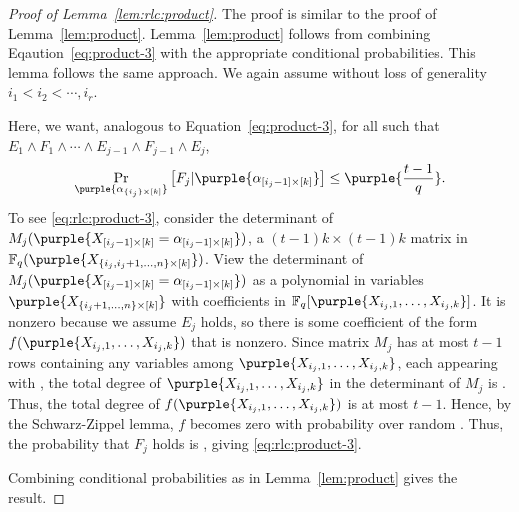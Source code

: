 \documentclass{article}[11pt]
\begin{document}
\begin{proof}[Proof of Lemma~\ref{lem:rlc:product}]
  The proof is similar to the proof of Lemma~\ref{lem:product}.
  Lemma~\ref{lem:product} follows from combining Eqaution~\eqref{eq:product-3} with the appropriate conditional probabilities.
  This lemma follows the same approach.
  We again assume without loss of generality $i_1<i_2<\cdots,i_r$.

  Here, we want, analogous to Equation~\eqref{eq:product-3}, for all \purple{$\alpha_{[i_j-1]\times [k]}$} such that $E_1\wedge F_1\wedge\cdots\wedge E_{j-1}\wedge F_{j-1}\wedge E_j$,
  \begin{align}
    \Pr_{\purple{\alpha_{\{i_j\}\times [k]}}}\left[F_j|\purple{\alpha_{[i_j-1]\times [k]}}\right]\le \purple{\frac{t-1}{q}}.
    \label{eq:rlc:product-3}
  \end{align}
  To see \eqref{eq:rlc:product-3}, consider the determinant of $M_j(\purple{X_{[i_j-1]\times [k]}=\alpha_{[i_j-1]\times [k]}})$, a $(t-1)k\times (t-1)k$ matrix in $\mathbb{F}_q(\purple{X_{\{i_j,i_j+1,\dots,n\}\times [k]}})$. 
  View the determinant of $M_j(\purple{X_{[i_j-1]\times [k]}=\alpha_{[i_j-1]\times [k]}})$ as a polynomial in variables $\purple{X_{\{i_j+1,\dots,n\}\times [k]}}$ with coefficients in $\mathbb{F}_q[\purple{X_{i_j,1},\dots,X_{i_j,k}}]$.
  It is nonzero because we assume $E_j$ holds, so there is some coefficient of the form $f(\purple{X_{i_j,1},\dots,X_{i_j,k}})$ that is nonzero.
  Since matrix $M_j$ has at most $t-1$ rows containing any variables among $\purple{X_{i_j,1},\dots,X_{i_j,k}}$, each appearing with , the total degree of $\purple{X_{i_j,1},\dots,X_{i_j,k}}$ in the determinant of $M_j$ is .
  Thus, the total degree of $f(\purple{X_{i_j,1},\dots,X_{i_j,k}})$ is at most $t-1$.
  Hence, by the Schwarz-Zippel lemma, $f$ becomes zero with probability  over random .
  Thus, the probability that $F_j$ holds is , giving \eqref{eq:rlc:product-3}.

Combining conditional probabilities as in Lemma~\ref{lem:product} gives the result.
\end{proof}
\end{document}
